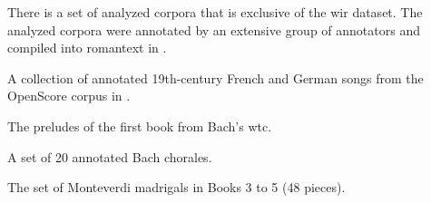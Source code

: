 

There is a set of analyzed corpora that is exclusive of the
\gls{wir} dataset. The analyzed corpora were annotated by an
extensive group of annotators and compiled into
\gls{romantext} in \textcite{gotham2019romantext}.


A collection of annotated 19th-century French and German
songs from the OpenScore corpus in
\textcite{gotham2022openscore}.


The preludes of the first book from Bach's \gls{wtc}. 


A set of 20 annotated Bach chorales.


The set of Monteverdi madrigals in Books 3 to 5 (48 pieces).
